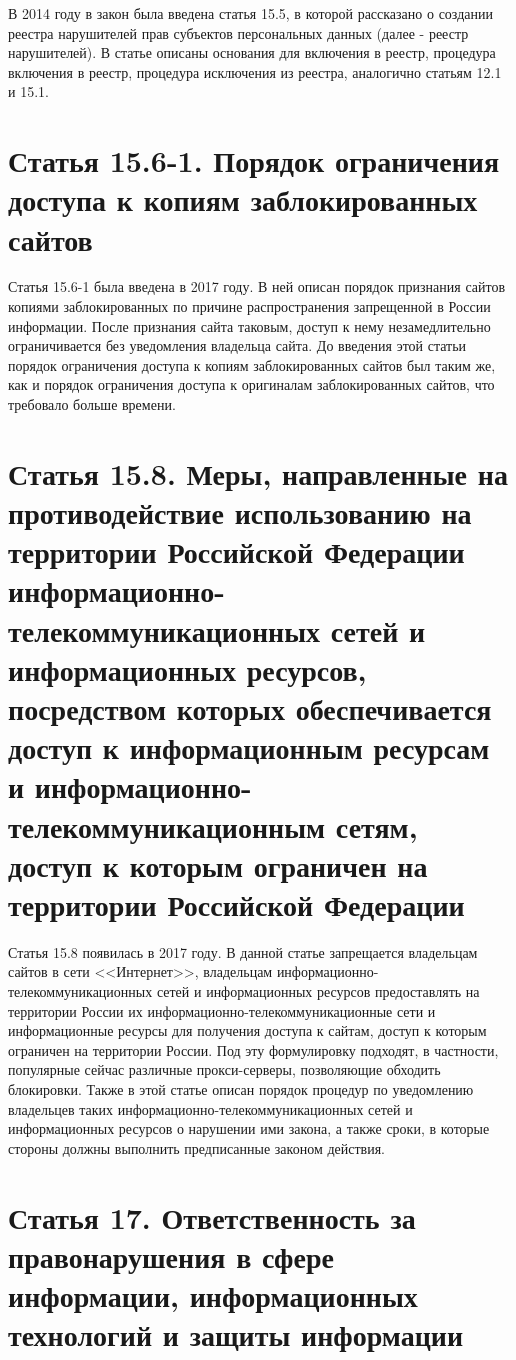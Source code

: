 В 2014 году в закон была введена статья 15.5, в которой рассказано о создании реестра нарушителей прав субъектов персональных данных (далее - реестр нарушителей). В статье описаны основания для включения в реестр, процедура включения в реестр, процедура исключения из реестра, аналогично статьям 12.1 и 15.1. 

\section{Статья 15.6-1. Порядок ограничения доступа к копиям заблокированных сайтов}

Статья 15.6-1 была введена в 2017 году. В ней описан порядок признания сайтов копиями заблокированных по причине распространения запрещенной в России информации. После признания сайта таковым, доступ к нему незамедлительно ограничивается без уведомления владельца сайта. До введения этой статьи порядок ограничения доступа к копиям заблокированных сайтов был таким же, как и порядок ограничения доступа к оригиналам заблокированных сайтов, что требовало больше времени.

\section{Статья 15.8. Меры, направленные на противодействие использованию на территории Российской Федерации информационно-телекоммуникационных сетей и информационных ресурсов, посредством которых обеспечивается доступ к информационным ресурсам и информационно-телекоммуникационным сетям, доступ к которым ограничен на территории Российской Федерации}

Статья 15.8 появилась в 2017 году. В данной статье запрещается владельцам сайтов в сети <<Интернет>>, владельцам информационно-телекоммуникационных сетей и информационных ресурсов предоставлять на территории России их информационно-телекоммуникационные сети и информационные ресурсы для получения доступа к сайтам, доступ к которым ограничен на территории России. Под эту формулировку подходят, в частности, популярные сейчас различные прокси-серверы, позволяющие обходить блокировки. Также в этой статье описан порядок процедур по уведомлению владельцев таких информационно-телекоммуникационных сетей и информационных ресурсов о нарушении ими закона, а также сроки, в которые стороны должны выполнить предписанные законом действия.

\section{Статья 17. Ответственность за правонарушения в сфере информации, информационных технологий и защиты информации}

